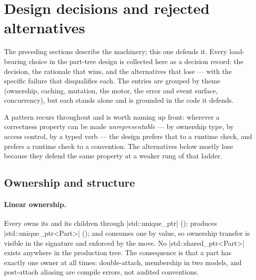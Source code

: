 \section{Design decisions and rejected alternatives}\label{sec:tradeoffs}

The preceding sections describe the machinery; this one defends it. Every load-bearing
choice in the part-tree design is collected here as a decision record: the decision, the
rationale that wins, and the alternatives that lose --- with the specific failure that
disqualifies each. The entries are grouped by theme (ownership, caching, mutation,
the motor, the error and event surface, concurrency), but each stands alone and is
grounded in the code it defends.

A pattern recurs throughout and is worth naming up front: wherever a correctness property
can be made \emph{unrepresentable} --- by ownership type, by access control, by a typed
verb --- the design prefers that to a runtime check, and prefers a runtime check to a
convention. The alternatives below mostly lose because they defend the same property at a
weaker rung of that ladder.

\subsection{Ownership and structure}\label{sec:tradeoffs-ownership}

\paragraph{Linear ownership.}
Every  owns its  and its children through
\cppinline|std::unique_ptr| ();  produces
\cppinline|std::unique_ptr<Part>| (); and
 consumes one by value, so ownership transfer is visible in the
signature and enforced by the move. No \cppinline|std::shared_ptr<Part>| exists anywhere
in the production tree. The consequence is that a part has exactly one owner at all
times: double-attach, membership in two models, and post-attach aliasing are compile
errors, not audited conventions.

